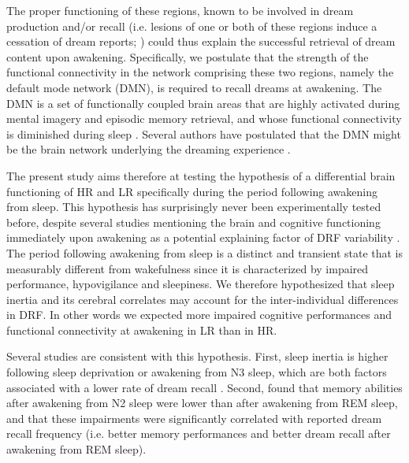 The proper functioning of these regions, known to be involved in dream production and/or recall (i.e. lesions of one or both of these regions induce a cessation of dream reports; \citealp{solms_neuropsychology_1997, solms_dreaming_2000}) could thus explain the successful retrieval of dream content upon awakening. Specifically, we postulate that the strength of the functional connectivity in the network comprising these two regions, namely the default mode network (DMN), is required to recall dreams at awakening. The DMN is a set of functionally coupled brain areas \citep{raichle_default_2001, legrand_what_2009, sestieri_episodic_2011} that are highly activated during mental imagery and episodic memory retrieval, and whose functional connectivity is diminished during sleep \citep{horovitz_decoupling_2009, larson-prior_modulation_2011, samann_development_2011}. Several authors have postulated that the DMN might be the brain network underlying the dreaming experience \citep{domhoff_neural_2011, christoff_mind-wandering_2016}.

The present study aims therefore at testing the hypothesis of a differential brain functioning of HR and LR specifically during the period following awakening from sleep. This hypothesis has surprisingly never been experimentally tested before, despite several studies mentioning the brain and cognitive functioning immediately upon awakening as a potential explaining factor of DRF variability \citep{schredl_factors_2003, conduit_poor_2004}. The period following awakening from sleep is a distinct and transient state that is measurably different from wakefulness since it is characterized by impaired performance, hypovigilance and sleepiness. We therefore hypothesized that sleep inertia and its cerebral correlates may account for the inter-individual differences in DRF. In other words we expected more impaired cognitive performances and functional connectivity at awakening in LR than in HR.

Several studies are consistent with this hypothesis. First, sleep inertia is higher following sleep deprivation or awakening from N3 sleep, which are both factors associated with a lower rate of dream recall \citep{nielsen_review_2000, de_gennaro_recovery_2010}. Second, \citet{conduit_poor_2004} found that memory abilities after awakening from N2 sleep were lower than after awakening from REM sleep, and that these impairments were significantly correlated with reported dream recall frequency (i.e. better memory performances and better dream recall after awakening from REM sleep).

